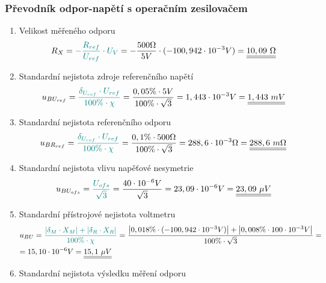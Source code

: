 \documentclass[a4paper, czech]{article}
\begin{document}
\subsubsection{Převodník odpor-napětí s operačním zesilovačem}

\begin{enumerate}
    \item Velikost měřeného odporu
    \begin{multline*}
        R_X = \textcolor{teal}{- \frac{R_{ref}}{U_{ref}} \cdot U_V} = - \frac{500 \Omega}{5V} \cdot (- 100,942 \cdot 10^{-3}V) = \underline{\underline{10,09\ \Omega}} \hfill
    \end{multline*}
    \item Standardní nejistota zdroje referenčního napětí
    \begin{multline*}
        u_{BU_{ref}} = \textcolor{teal}{\frac{\delta_{U_{ref}} \cdot U_{ref}}{100\% \cdot \chi}} = \frac{0,05\% \cdot 5V}{100\% \cdot \sqrt{3}} = 1,443 \cdot 10^{-3}V = \underline{\underline{1,443\ mV}} \hfill
    \end{multline*}
    \item Standardní nejistota referenčního odporu
    \begin{multline*}
        u_{BR_{ref}} = \textcolor{teal}{\frac{\delta_{U_{ref}} \cdot U_{ref}}{100\% \cdot \chi}} = \frac{0,1\% \cdot 500 \Omega}{100\% \cdot \sqrt{3}} = 288,6 \cdot 10^{-3} \Omega = \underline{\underline{288,6\ m\Omega}} \hfill
    \end{multline*}
    \item Standardní nejistota vlivu napěťové nesymetrie
    \begin{multline*}
        u_{BU_{ofs}} = \textcolor{teal}{\frac{U_{ofs}}{\sqrt{3}}} = \frac{40 \cdot 10^{-6} V}{\sqrt{3}} = 23,09 \cdot 10^{-6} V = \underline{\underline{23,09\ \mu V}} \hfill
    \end{multline*}
    \item Standardní přístrojové nejistota voltmetru
    \begin{multline*}
        u_{BU} = \textcolor{teal}{\frac{\left|\delta_M \cdot X_M\right| + \left|\delta_R \cdot X_R\right|}{100 \% \cdot \chi}} = \frac{\left|0,018\% \cdot (- 100,942 \cdot 10^{-3}V)\right| + \left|0,008\% \cdot 100 \cdot 10^{-3}V\right|}{100 \% \cdot \sqrt{3}} = \hfill \\
        = 15,10 \cdot 10^{-6} V = \underline{\underline{15,1\ \mu V}} \hfill
    \end{multline*}
    \item Standardní nejistota výsledku měření odporu

\end{enumerate}
\end{document}
